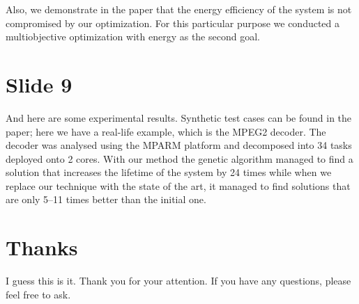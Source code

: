 \documentclass[11pt,a4paper]{article}
\begin{document}
Also, we demonstrate in the paper that the energy efficiency of the system is not compromised by our optimization. For this particular purpose we conducted a multiobjective optimization with energy as the second goal.

\section{Slide 9}
And here are some experimental results. Synthetic test cases can be found in the paper; here we have a real-life example, which is the MPEG2 decoder. The decoder was analysed using the MPARM platform and decomposed into 34 tasks deployed onto 2 cores. With our method the genetic algorithm managed to find a solution that increases the lifetime of the system by 24 times while when we replace our technique with the state of the art, it managed to find solutions that are only 5--11 times better than the initial one.

\section{Thanks}
I guess this is it. Thank you for your attention. If you have any questions, please feel free to ask.
\end{document}
